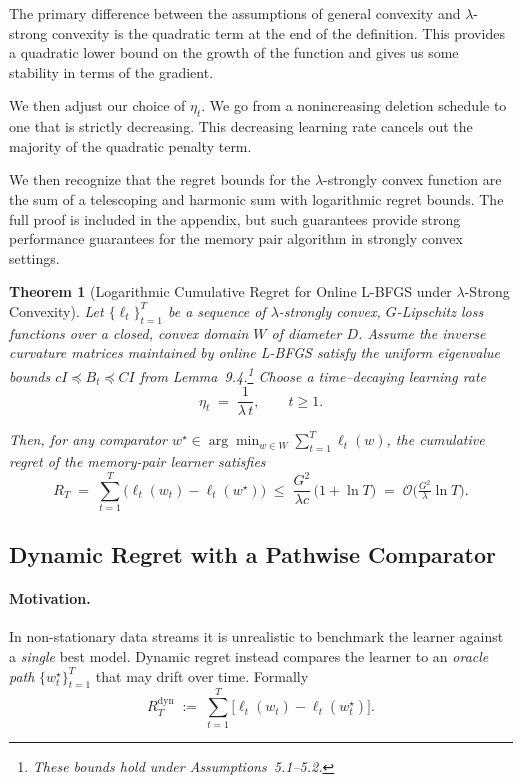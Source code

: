 \documentclass[a4paper,12pt]{article}
\newtheorem{theorem}{Theorem}[section]
\begin{document}
The primary difference between the assumptions of general convexity and $\lambda$-strong convexity is the quadratic term at the end of the definition. This provides a quadratic lower bound on the growth of the function and gives us some stability in terms of the gradient.

We then adjust our choice of $\eta_{t}$. We go from a nonincreasing deletion schedule to one that is strictly decreasing. This decreasing learning rate cancels out the majority of the quadratic penalty term.

We then recognize that the regret bounds for the $\lambda$-strongly convex function are the sum of a telescoping and harmonic sum with logarithmic regret bounds. The full proof is included in the appendix, but such guarantees provide strong performance guarantees for the memory pair algorithm in strongly convex settings.

\begin{theorem}[Logarithmic Cumulative Regret for Online L\textnormal{-}BFGS under $\lambda$-Strong Convexity]
\label{thm:log_regret}
Let $\{\ell_t\}_{t=1}^T$ be a sequence of $\lambda$-strongly convex, $G$-Lipschitz loss functions over a closed, convex domain $W$ of diameter $D$.  
Assume the inverse curvature matrices maintained by online \mbox{L-BFGS} satisfy the uniform eigenvalue bounds $cI \preceq B_t \preceq CI$ from Lemma~9.4.\footnote{These bounds hold under Assumptions~5.1–5.2.}  
Choose a time–decaying learning rate
$$
\eta_t \;=\;\frac{1}{\lambda\,t}, \qquad t\ge 1.
$$

Then, for any comparator $w^\star\in\arg\min_{w\in W}\sum_{t=1}^T \ell_t(w)$, the cumulative regret of the memory-pair learner satisfies
$$
R_T \;=\;\sum_{t=1}^T \bigl(\ell_t(w_t)-\ell_t(w^\star)\bigr)
\;\le\;
\frac{G^{2}}{\lambda c}\,\bigl(1+\ln T\bigr)
\;=\;
\mathcal{O}\!\bigl(\tfrac{G^{2}}{\lambda}\ln T\bigr).
$$
\end{theorem}

\subsection{Dynamic Regret with a Pathwise Comparator}
\label{subsec:dynamic_regret}

\paragraph{Motivation.}
In non-stationary data streams it is unrealistic to benchmark the learner
against a \emph{single} best model.
Dynamic regret instead compares the learner to an \emph{oracle path}
$\{w_t^{\star}\}_{t=1}^{T}$ that may drift over time.
Formally
\[
  R_T^{\mathrm{dyn}}
  \;:=\;
  \sum_{t=1}^{T}\bigl[\ell_t(w_t)-\ell_t(w_t^{\star})\bigr].
\]
\end{document}
